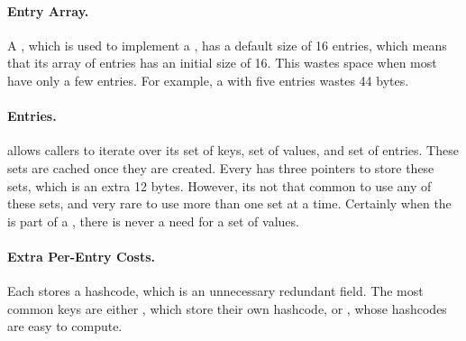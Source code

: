 \paragraph{Entry Array.} 
A , which is used to implement a , has a default
size of 16 entries, which means that its array of entries has an initial
size of 16. This wastes space when most  have only a few
entries. For example, a  with five entries wastes 44 bytes.

\paragraph{Entries.}  allows callers to iterate over
its set of keys, set of values, and set of entries. These sets are cached once
they are created. Every  has three pointers
to store these sets, which is an extra 12 bytes.
However, its not that common to use
any of these sets, and very rare to use more than one set at a time.
 Certainly when the  is part of a , 
there is never a need for a set of values.
  
 \paragraph{Extra Per-Entry Costs.} Each  stores a
 hashcode, which is an unnecessary redundant field. The most common keys are either
 , which store their own hashcode, or , whose
 hashcodes are easy to compute. 
\paragraph{}


